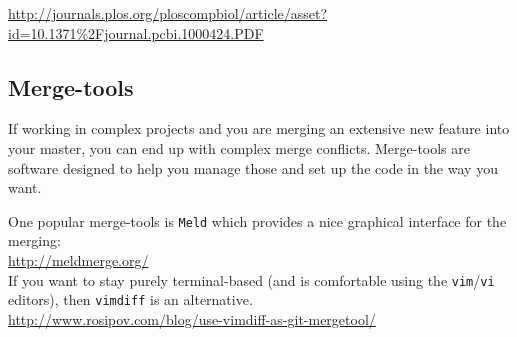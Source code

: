 \documentclass[../main/git_course_main.tex]{subfiles}
\begin{document}
\url{http://journals.plos.org/ploscompbiol/article/asset?id=10.1371\%2Fjournal.pcbi.1000424.PDF}

\subsection{Merge-tools}

If working in complex projects and you are merging an extensive new feature into your master, you can end up with complex merge conflicts. Merge-tools are software designed to help you manage those and set up the code in the way you want.

One popular merge-tools is \verb$Meld$ which provides a nice graphical interface for the merging: \\

\url{http://meldmerge.org/} \\

If you want to stay purely terminal-based (and is comfortable using the \verb$vim$/\verb$vi$ editors), then \verb$vimdiff$ is an alternative. \\

\url{http://www.rosipov.com/blog/use-vimdiff-as-git-mergetool/}
\end{document}
